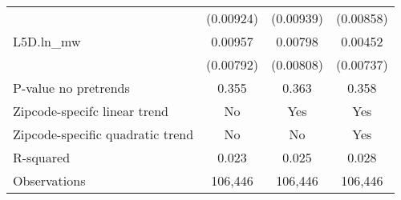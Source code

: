 {\begin{tabular}{l*{3}{c}}
          &(0.00924)         &(0.00939)         &(0.00858)         \\
[1em]
L5D.ln\_mw &  0.00957         &  0.00798         &  0.00452         \\
          &(0.00792)         &(0.00808)         &(0.00737)         \\
\hline
P-value no pretrends&    0.355         &    0.363         &    0.358         \\
Zipcode-specifc linear trend&       No         &      Yes         &      Yes         \\
Zipcode-specific quadratic trend&       No         &       No         &      Yes         \\
R-squared &    0.023         &    0.025         &    0.028         \\
Observations&  106,446         &  106,446         &  106,446         \\
\hline\hline
\end{tabular}
}
